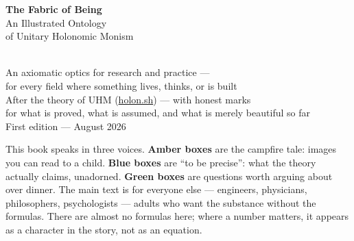 \documentclass[11pt,letterpaper]{article}
\newcommand{\holonsh}{\href{https://holon.sh}{holon.sh}\xspace}
\begin{document}
\begin{titlepage}
\centering
\vspace*{28pt}
{\Huge\bfseries The Fabric of Being}\\[10pt]
{\LARGE An Illustrated Ontology\\[3pt] of Unitary Holonomic Monism}\\[26pt]
\\[26pt]
{\large An axiomatic optics for research and practice ---\\
for every field where something lives, thinks, or is built}\\[18pt]
{\small\color{plosgray} After the theory of UHM (\holonsh) --- with honest marks\\
for what is proved, what is assumed, and what is merely beautiful so far}\\[10pt]
{\small\color{plosgray} First edition --- August 2026}
\vfill
\begin{talebox}
This book speaks in three voices. \textcolor{ember}{\textbf{Amber boxes}} are
the campfire tale: images you can read to a child.
\textcolor{fact}{\textbf{Blue boxes}} are ``to be precise'': what the theory
actually claims, unadorned. \textcolor{leaf}{\textbf{Green boxes}} are
questions worth arguing about over dinner. The main text is for everyone else
--- engineers, physicians, philosophers, psychologists --- adults who want the
substance without the formulas. There are almost no formulas here; where a
number matters, it appears as a character in the story, not as an equation.
\end{talebox}
\end{titlepage}
\end{document}
